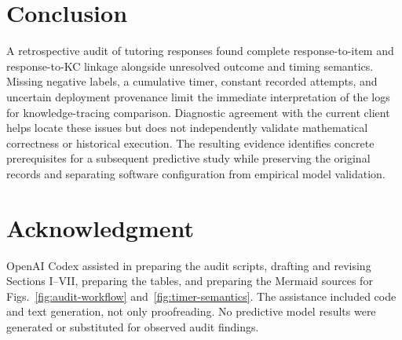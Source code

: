 \documentclass[conference]{IEEEtran}
\newif\ifworkingdraft
\newcommand{\draftnote}[1]{\ifworkingdraft\par\noindent\textcolor{red}{\textbf{Author review:} #1}\par\fi}
\begin{document}
\section{Conclusion}
A retrospective audit of \ResponseCount{} tutoring responses found complete response-to-item and response-to-KC linkage alongside unresolved outcome and timing semantics. Missing negative labels, a cumulative timer, constant recorded attempts, and uncertain deployment provenance limit the immediate interpretation of the logs for knowledge-tracing comparison. Diagnostic agreement with the current client helps locate these issues but does not independently validate mathematical correctness or historical execution. The resulting evidence identifies concrete prerequisites for a subsequent predictive study while preserving the original records and separating software configuration from empirical model validation.

\section*{Acknowledgment}
OpenAI Codex assisted in preparing the audit scripts, drafting and revising Sections I--VII, preparing the tables, and preparing the Mermaid sources for Figs.~\ref{fig:audit-workflow} and~\ref{fig:timer-semantics}. The assistance included code and text generation, not only proofreading. No predictive model results were generated or substituted for observed audit findings.
\draftnote{Independently verify the scripts, reported results, references, diagram exports, and final text. Revise the assistance statement if the final sections or figures change. Complete author review is required before submission.}



\end{document}
